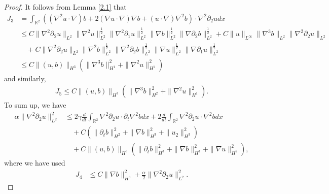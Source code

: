 \documentclass[reqno,11pt]{amsart}
\def\R{\mathbb R}
\numberwithin{Thm}{section}
\begin{document}
\begin{proof}
It follows from  Lemma \ref{2.1} that
\begin{align}\label{L3}
J_{3}
&=\int_{\R^2}((\nabla^2u\cdot\nabla) b+2(\nabla  u\cdot\nabla)\nabla b+(u\cdot\nabla)\nabla^2 b)\cdot\nabla^2\partial_2 udx\nonumber\\
&\leq C\|\nabla^2\partial_2 u\|_{L^{2}}\|\nabla^2u\|_{L^{2}}^{\frac{1}{2}}\|\nabla^2\partial_1 u\|_{L^{2}}^{\frac{1}{2}}\|\nabla b\|_{L^{2}}^{\frac{1}{2}}\|\nabla\partial_2 b\|_{L^{2}}^{\frac{1}{2}}+C\|u\|_{L^{\infty}}\|\nabla^3 b\|_{L^{2}}\| \nabla^2\partial_2u\|_{L^{2}}\nonumber\\
&\quad+C\|\nabla^2\partial_2 u\|_{L^{2}}\|\nabla^2b\|_{L^{2}}^{\frac{1}{2}}\|\nabla^2\partial_2 b\|_{L^{2}}^{\frac{1}{2}}\|\nabla u\|_{L^{2}}^{\frac{1}{2}}\|\nabla\partial_1 u\|_{L^{2}}^{\frac{1}{2}}\nonumber\\
&\leq C\| (u,b)\|_{H^{3}}\left(\|\nabla^3 b\|_{H^{1}}^2+\|\nabla^2u\|_{H^{1}}^2\right)
\end{align}
and similarly,
\begin{align}\label{L4}
J_{5}
\leq C\| (u,b)\|_{H^{3}}\left(\|\nabla^3 b\|_{H^{2}}^2+\|\nabla^2 u\|_{H^{1}}^2\right).
\end{align}
To sum up, we have
\begin{align}\label{A22}
\alpha\|\nabla^2\partial_2u\|^2_{L^2}&\leq2\gamma\frac{d}{dt}\int_{\R^2}\nabla^2\partial_2u\cdot\partial_t\nabla^2 bdx+2\frac{d}{dt}\int_{\R^2}\nabla^2\partial_2u\cdot\nabla^2bdx\nonumber\\
&\quad+C\left(\|\partial_t b\|_{H^2}^2+\|\nabla b\|_{H^3}^2+\|u_2\|_{H^3}^2\right)\nonumber\\
&\quad+ C\| (u,b)\|_{H^{3}}\left(\|\partial_t b\|_{H^{3}}^2+\|\nabla b\|_{H^{3}}^2+\|\nabla u\|_{H^{2}}^2\right),
\end{align}
where we have used
\begin{align*}
J_{4}&\leq C\| \nabla b\|_{H^{3}}^2+\frac{\alpha}{2}\|\nabla^2\partial_2u\|_{L^{2}}^2.
\end{align*}


\end{proof}
\end{document}
